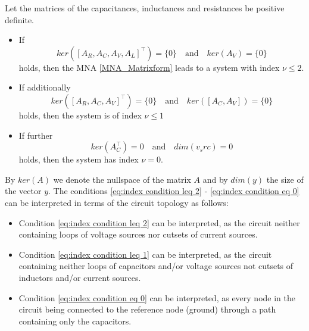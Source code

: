 \begin{theorem}
	Let the matrices of the capacitances, inductances and resistances be positive definite.
	\begin{itemize}
		\item If
		\begin{equation}
			\label{eq:index condition leq 2}
			ker([A_R, A_C, A_V, A_L]^\top) = \{0\} \quad \text{and} \quad ker(A_V) = \{0\}
		\end{equation}
		holds, then the MNA \eqref{MNA_Matrixform} leads to a system with index $\nu \leq 2$.
		
		\item If additionally
		\begin{equation}
			\label{eq:index condition leq 1}
			ker([A_R, A_C, A_V]^\top) = \{0\} \quad \text{and} \quad ker([A_C, A_V]) = \{0\}
		\end{equation}
		holds, then the system is of index $\nu \leq 1$
		
		\item If further
		\begin{equation}
			\label{eq:index condition eq 0}
			ker(A_C^\top) = 0 \quad \text{and} \quad dim(v_src) = 0
		\end{equation}
		holds, then the system has index $\nu = 0$.
	\end{itemize}
\end{theorem}

By $ker(A)$ we denote the nullspace of the matrix $A$ and by $dim(y)$ the size of the vector $y$. The conditions \eqref{eq:index condition leq 2} - \eqref{eq:index condition eq 0} can be interpreted in terms of the circuit topology as follows:
\begin{itemize}
	\item Condition \eqref{eq:index condition leq 2} can be interpreted, as the circuit neither containing loops of voltage sources nor cutsets of current sources.
	\item Condition \eqref{eq:index condition leq 1} can be interpreted, as the circuit containing neither loops of capacitors and/or voltage sources not cutsets of inductors and/or current sources.
	\item Condition \eqref{eq:index condition eq 0} can be interpreted, as every node in the circuit being connected to the reference node (ground) through a path containing only the capacitors.
\end{itemize}

